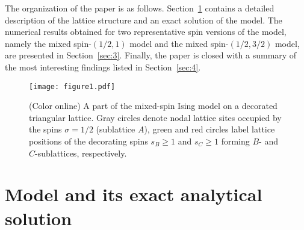 \documentclass[final,5p,times,sort&compress]{elsarticle}
\begin{document}
The organization of the paper is as follows. Section~\ref{sec:2} contains a detailed
description of the lattice structure and an exact solution of the model. The numerical  results obtained for two representative spin versions of the model, namely the mixed spin-$(1/2,1)$ model and the mixed spin-$(1/2,3/2)$ model, are presented in Section~\ref{sec:3}. Finally, the paper is closed with a summary of the most interesting findings listed in Section~\ref{sec:4}.
\begin{figure}[t!]
\centering
  \texttt{[image: figure1.pdf]}
\caption{(Color online) A part of the mixed-spin Ising model on a decorated triangular lattice. Gray circles denote nodal lattice sites occupied by the spins $\sigma = 1/2$ (sublattice $A$), green and red circles label lattice positions of the decorating spins $s_B\geq1$ and $s_C\geq1$ forming $B$- and $C$-sublattices, respectively.}
\label{fig:1}
\end{figure}

\section{Model and its exact analytical solution}
\label{sec:2}
\end{document}
